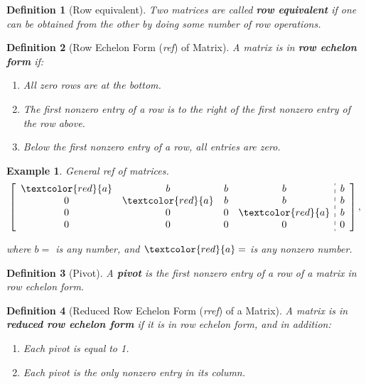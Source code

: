 \documentclass[12pt, a4paper]{article}
\newtheorem{df}{Definition}[subsection]
\newtheorem{eg}{Example}[subsection]
\begin{document}
\begin{df}[Row equivalent]
Two matrices are called \textbf{row equivalent} if one can be obtained from the other by doing some number of row operations. 
\end{df}

\begin{df}[Row Echelon Form (\emph{ref}) of Matrix]
A matrix is in \textbf{row echelon form} if: 
\begin{enumerate}
\item All zero rows are at the bottom.
\item The first nonzero entry of a row is to the \textit{right} of the first nonzero entry of the row above. 
\item Below the first nonzero entry of a row, all entries are zero.
\end{enumerate}
\end{df}

\begin{eg} 
General \emph{ref} of matrices. 
$$\left[\begin{array}{c:c}\begin{matrix}\textcolor{red}{a}&b&b&b\\0&\textcolor{red}{a}&b&b\\0&0&0&\textcolor{red}{a}\\0&0&0&0\end{matrix}&\begin{matrix}b\\b\\b\\0\end{matrix}\end{array}\right], $$

where $b=$ is any number, and $\textcolor{red}{a}=$ is any nonzero number.
\end{eg}
\begin{df}[Pivot]
A \textbf{\textit{pivot}} is the first nonzero entry of a row of a matrix in row echelon form.
\end{df}

\begin{df}[Reduced Row Echelon Form (\emph{rref}) of a Matrix]
A matrix is in \textbf{reduced row echelon form} if it is in row echelon form, and in addition:
\begin{enumerate}
\item[4.] Each pivot is equal to 1. 
\item[5.] Each pivot is the only nonzero entry in its column.
\end{enumerate}
\end{df}
\end{document}
